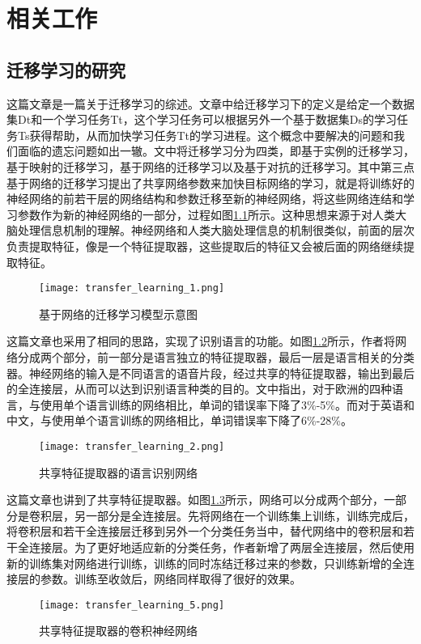 
\chapter{相关工作}
\section{迁移学习的研究}

这篇文章\cite{10.1007/978-3-030-01424-7_27}是一篇关于迁移学习的综述。文章中给迁移学习下的定义是给定一个数据集Dt和一个学习任务Tt，这个学习任务可以根据另外一个基于数据集Ds的学习任务Ts获得帮助，从而加快学习任务Tt的学习进程。这个概念中要解决的问题和我们面临的遗忘问题如出一辙。文中将迁移学习分为四类，即基于实例的迁移学习，基于映射的迁移学习，基于网络的迁移学习以及基于对抗的迁移学习。其中第三点基于网络的迁移学习提出了共享网络参数来加快目标网络的学习，就是将训练好的神经网络的前若干层的网络结构和参数迁移至新的神经网络，将这些网络连结和学习参数作为新的神经网络的一部分，过程如图\ref{fig:transfer_learning_1}所示。这种思想来源于对人类大脑处理信息机制的理解。神经网络和人类大脑处理信息的机制很类似，前面的层次负责提取特征，像是一个特征提取器，这些提取后的特征又会被后面的网络继续提取特征。
\begin{figure}
    \centering
    \texttt{[image: transfer\_learning\_1.png]}
    \caption{基于网络的迁移学习模型示意图}
    \label{fig:transfer_learning_1}
\end{figure}

这篇文章\cite{6639081}也采用了相同的思路，实现了识别语言的功能。如图\ref{fig:transfer_learning_2}所示，作者将网络分成两个部分，前一部分是语言独立的特征提取器，最后一层是语言相关的分类器。神经网络的输入是不同语言的语音片段，经过共享的特征提取器，输出到最后的全连接层，从而可以达到识别语言种类的目的。文中指出，对于欧洲的四种语言，与使用单个语言训练的网络相比，单词的错误率下降了3\%-5\%。而对于英语和中文，与使用单个语言训练的网络相比，单词错误率下降了6\%-28\%。
\begin{figure}
    \centering
    \texttt{[image: transfer\_learning\_2.png]}
    \caption{共享特征提取器的语言识别网络}
    \label{fig:transfer_learning_2}
\end{figure}

这篇文章\cite{Oquab_2014_CVPR}也讲到了共享特征提取器。如图\ref{fig:transfer_learning_5}所示，网络可以分成两个部分，一部分是卷积层，另一部分是全连接层。先将网络在一个训练集上训练，训练完成后，将卷积层和若干全连接层迁移到另外一个分类任务当中，替代网络中的卷积层和若干全连接层。为了更好地适应新的分类任务，作者新增了两层全连接层，然后使用新的训练集对网络进行训练，训练的同时冻结迁移过来的参数，只训练新增的全连接层的参数。训练至收敛后，网络同样取得了很好的效果。 
\begin{figure}
    \centering
    \texttt{[image: transfer\_learning\_5.png]}
    \caption{共享特征提取器的卷积神经网络}
    \label{fig:transfer_learning_5}
\end{figure}

